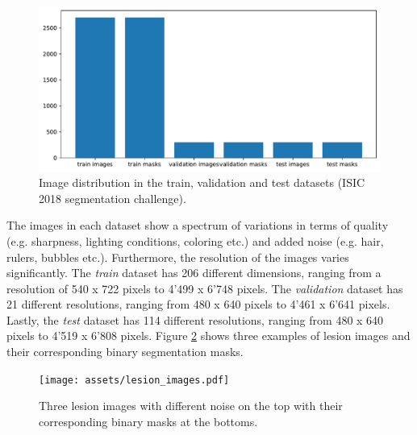 \begin{figure}[ht]
\centering
\includegraphics[width=\columnwidth]{assets/datasets.pdf}
\caption[Datasets]
{Image distribution in the train, validation and test datasets (ISIC 2018 segmentation challenge).}
\label{datasets}
\end{figure}

The images in each dataset show a spectrum of variations in terms of quality (e.g. sharpness, lighting conditions, coloring etc.) and added noise (e.g. hair, rulers, bubbles etc.). Furthermore, the resolution of the images varies significantly. The \emph{train} dataset has 206 different dimensions, ranging from a resolution of 540 x 722 pixels to 4'499 x 6'748 pixels. The \emph{validation} dataset has 21 different resolutions, ranging from 480 x 640 pixels to 4'461 x 6'641 pixels. Lastly, the \emph{test} dataset has 114 different resolutions, ranging from 480 x 640 pixels to 4'519 x 6'808 pixels. Figure \ref{lesion_images} shows three examples of lesion images and their corresponding binary segmentation masks.

\begin{figure}[ht]
\centering
\texttt{[image: assets/lesion\_images.pdf]}
\caption[Lesion Images]
{Three lesion images with different noise on the top with their corresponding binary masks at the bottoms.}
\label{lesion_images}
\end{figure}


